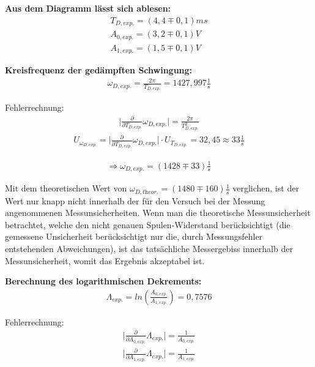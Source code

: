 \documentclass[a4paper]{scrartcl}
\numberwithin{equation}{subsection}
\begin{document}
\textbf{Aus dem Diagramm lässt sich ablesen:}
\begin{align*}
T_{D,\textit{exp.}} = (4,4\mp0,1)ms \\
A_{0,\textit{exp.}} = (3,2\mp0,1)V \\
A_{1,\textit{exp.}} = (1,5\mp0,1)V
\end{align*}

\textbf{Kreisfrequenz der gedämpften Schwingung:}
\begin{align}
\omega_{D,\textit{exp.}} = \frac{2\pi}{T_{D,\textit{exp.}}} = 1427,997 \frac{1}{s}
\end{align}

Fehlerrechnung:
\begin{align*}
\vert \frac{\partial}{\partial T_{D,\textit{exp.}}}\omega_{D,\textit{exp.}}\vert = \frac{2\pi}{T_{D,\textit{exp.}}^2}
\end{align*}
\begin{align*}
U_{\omega_{D,\textit{exp.}}} = \vert \frac{\partial}{\partial T_{D,\textit{exp.}}}\omega_{D,\textit{exp.}}\vert \cdot U_{T_{D,\textit{exp.}}} = 32,45 \approx 33 \frac{1}{s} 
\end{align*}

\begin{align*}
\Rightarrow \omega_{D,\textit{exp.}} = (1428 \mp 33) \frac{1}{s}
\end{align*}

Mit dem theoretischen Wert von $\omega_{D,\textit{theor.}} = (1480\mp160) \frac{1}{s}$ verglichen, ist der Wert nur knapp nicht innerhalb der für den Versuch bei der Messung angenommenen Messunsicherheiten. Wenn man die theoretische Messunsicherheit betrachtet, welche den nicht genauen Spulen-Widerstand berücksichtigt (die gemessene Unsicherheit berücksichtigt nur die, durch Messungsfehler entstehenden Abweichungen), ist das tatsächliche Messergebiss innerhalb der Messunsicherheit, womit das Ergebnis akzeptabel ist.

\textbf{Berechnung des logarithmischen Dekrements:}
\begin{align}
\Lambda_{\textit{exp.}} = ln(\frac{A_{0,\textit{exp.}}}{A_{1,\textit{exp.}}}) = 0,7576
\end{align}

Fehlerrechnung:
\begin{align*}
\vert \frac{\partial}{\partial A_{0,\textit{exp.}}}\Lambda_{\textit{exp.}}\vert = \frac{1}{A_{0,\textit{exp.}}} \\
\vert \frac{\partial}{\partial A_{1,\textit{exp.}}}\Lambda_{\textit{exp.}}\vert = \frac{1}{A_{1,\textit{exp.}}}
\end{align*}
\end{document}
